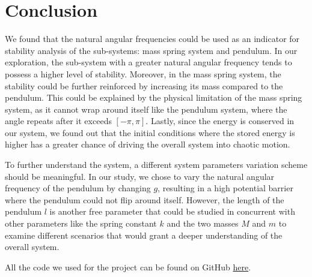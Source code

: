 \documentclass[12pt]{article}
\begin{document}
\section{Conclusion}
We found that the natural angular frequencies could be used as an indicator for stability analysis of the sub-systems: mass spring system and pendulum. In our exploration, the sub-system with a greater natural angular frequency tends to possess a higher level of stability. Moreover, in the mass spring system, the stability could be further reinforced by increasing its mass compared to the pendulum. This could be explained by the physical limitation of the mass spring system, as it cannot wrap around itself like the pendulum system, where the angle repeats after it exceeds $[-\pi, \pi]$. Lastly, since the energy is conserved in our system, we found out that the initial conditions where the stored energy is higher has a greater chance of driving the overall system into chaotic motion.

To further understand the system, a different system parameters variation scheme should be meaningful. In our study, we chose to vary the natural angular frequency of the pendulum by changing $g$, resulting in a high potential barrier where the pendulum could not flip around itself. However, the length of the pendulum $l$ is another free parameter that could be studied in concurrent with other parameters like the spring constant $k$ and the two masses $M$ and $m$ to examine different scenarios that would grant a deeper understanding of the overall system.

All the code we used for the project can be found on GitHub \href{https://github.com/NextZtepS/SpringedCart_and_Pendulum/tree/main}{here}.
\end{document}
